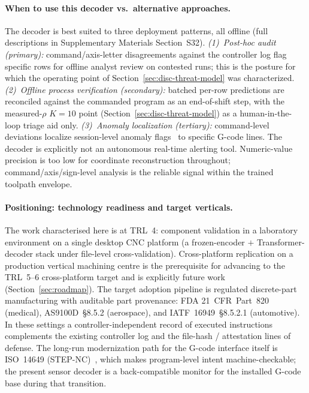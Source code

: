 \documentclass[sensors,article,submit,moreauthors,pdftex]{Definitions/mdpi}
\begin{document}
\paragraph{When to use this decoder vs.\ alternative approaches.}\label{sec:disc-when-to-use} The decoder is best suited to three deployment patterns, all offline (full descriptions in Supplementary Materials Section~S32). \emph{(1)~Post-hoc audit (primary):} command/axis-letter disagreements against the controller log flag specific rows for offline analyst review on contested runs; this is the posture for which the operating point of Section~\ref{sec:disc-threat-model} was characterized. \emph{(2)~Offline process verification (secondary):} batched per-row predictions are reconciled against the commanded program as an end-of-shift step, with the measured-$\rho$ $K\!=\!10$ point (Section~\ref{sec:disc-threat-model}) as a human-in-the-loop triage aid only. \emph{(3)~Anomaly localization (tertiary):} command-level deviations localize session-level anomaly flags~\cite{coelho2024anomaly,kimmell2025cnc} to specific G-code lines. The decoder is explicitly not an autonomous real-time alerting tool. Numeric-value precision is too low for coordinate reconstruction throughout; command/axis/sign-level analysis is the reliable signal within the trained toolpath envelope.

\paragraph{Positioning: technology readiness and target verticals.} The work characterised here is at TRL~4: component validation in a laboratory environment on a single desktop CNC platform (a frozen-encoder $+$ Transformer-decoder stack under file-level cross-validation). Cross-platform replication on a production vertical machining centre is the prerequisite for advancing to the TRL~5--6 cross-platform target and is explicitly future work (Section~\ref{sec:roadmap}). The target adoption pipeline is regulated discrete-part manufacturing with auditable part provenance: FDA 21~CFR~Part~820 (medical), AS9100D~\S{}8.5.2 (aerospace), and IATF~16949~\S{}8.5.2.1 (automotive). In these settings a controller-independent record of executed instructions complements the existing controller log and the file-hash / attestation lines of defense. The long-run modernization path for the G-code interface itself is ISO~14649 (STEP-NC)~\cite{iso14649}, which makes program-level intent machine-checkable; the present sensor decoder is a back-compatible monitor for the installed G-code base during that transition.
\end{document}
